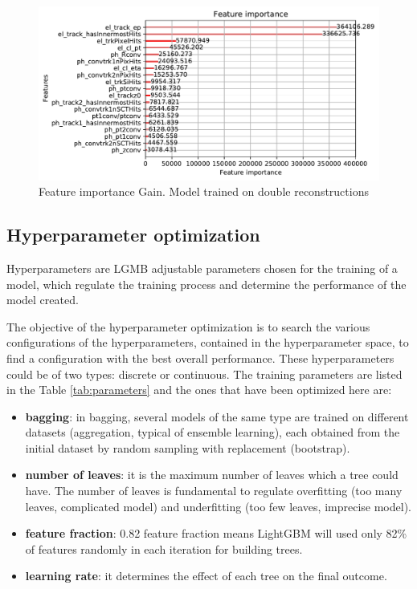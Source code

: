 \documentclass[a4paper, oneside, 11pt, openright]{book}
\begin{document}
\begin{itemize}
				\begin{figure}[H]
					\centering
					\includegraphics[width=.8\linewidth]{tesi_images/model_hyper_gain.pdf} 
					\caption{Feature importance Gain. Model trained on double reconstructions}
					\label{fig:gain} 
				\end{figure}
			\end{itemize}
			
			\subsection{Hyperparameter optimization}\label{section:Hyper_param}
				Hyperparameters are LGMB \cite{LGBM} adjustable parameters chosen for the training of a model, which regulate the training process and determine the performance of the model created. 
				
				The objective of the hyperparameter optimization is to search the various configurations of the hyperparameters, contained in the hyperparameter space, to find a configuration with the best overall performance. These hyperparameters could be of two types: discrete or continuous. %
				The training parameters are listed in the Table \ref{tab:parameters} and the ones that have been optimized here are:
				\begin{itemize}
					\item \textbf{bagging}: in bagging, several models of the same type are trained on different datasets (aggregation, typical of ensemble learning), each obtained from the initial dataset by random sampling with replacement (bootstrap).
					\item \textbf{number of leaves}: it is the maximum number of leaves which a tree could have. The number of leaves is fundamental to regulate overfitting (too many leaves, complicated model) and underfitting (too few leaves, imprecise model).
					\item \textbf{feature fraction}: 0.82 feature fraction means LightGBM will used only 82\% of features randomly in each iteration for building trees.
					\item \textbf{learning rate}: it determines the effect of each tree on the final outcome.
				\end{itemize}
				
\end{document}
